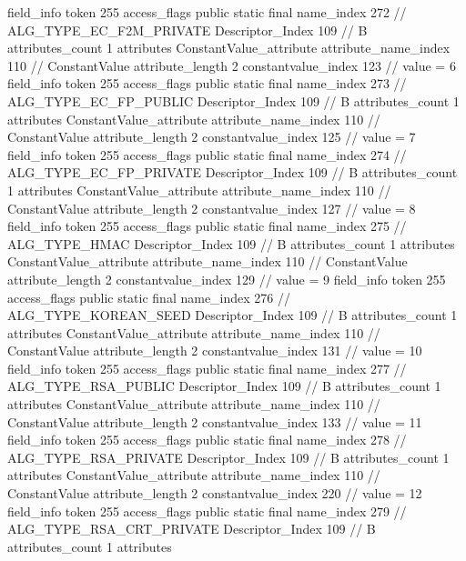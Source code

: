 {{{{{{{				}
				}
			}
			field_info {
				token	255
				access_flags	public static final
				name_index	272		// ALG_TYPE_EC_F2M_PRIVATE
				Descriptor_Index	109		// B
				attributes_count	1
				attributes {
				ConstantValue_attribute {
					attribute_name_index	110		// ConstantValue
					attribute_length	2
					constantvalue_index	123		// value = 6
				}
				}
			}
			field_info {
				token	255
				access_flags	public static final
				name_index	273		// ALG_TYPE_EC_FP_PUBLIC
				Descriptor_Index	109		// B
				attributes_count	1
				attributes {
				ConstantValue_attribute {
					attribute_name_index	110		// ConstantValue
					attribute_length	2
					constantvalue_index	125		// value = 7
				}
				}
			}
			field_info {
				token	255
				access_flags	public static final
				name_index	274		// ALG_TYPE_EC_FP_PRIVATE
				Descriptor_Index	109		// B
				attributes_count	1
				attributes {
				ConstantValue_attribute {
					attribute_name_index	110		// ConstantValue
					attribute_length	2
					constantvalue_index	127		// value = 8
				}
				}
			}
			field_info {
				token	255
				access_flags	public static final
				name_index	275		// ALG_TYPE_HMAC
				Descriptor_Index	109		// B
				attributes_count	1
				attributes {
				ConstantValue_attribute {
					attribute_name_index	110		// ConstantValue
					attribute_length	2
					constantvalue_index	129		// value = 9
				}
				}
			}
			field_info {
				token	255
				access_flags	public static final
				name_index	276		// ALG_TYPE_KOREAN_SEED
				Descriptor_Index	109		// B
				attributes_count	1
				attributes {
				ConstantValue_attribute {
					attribute_name_index	110		// ConstantValue
					attribute_length	2
					constantvalue_index	131		// value = 10
				}
				}
			}
			field_info {
				token	255
				access_flags	public static final
				name_index	277		// ALG_TYPE_RSA_PUBLIC
				Descriptor_Index	109		// B
				attributes_count	1
				attributes {
				ConstantValue_attribute {
					attribute_name_index	110		// ConstantValue
					attribute_length	2
					constantvalue_index	133		// value = 11
				}
				}
			}
			field_info {
				token	255
				access_flags	public static final
				name_index	278		// ALG_TYPE_RSA_PRIVATE
				Descriptor_Index	109		// B
				attributes_count	1
				attributes {
				ConstantValue_attribute {
					attribute_name_index	110		// ConstantValue
					attribute_length	2
					constantvalue_index	220		// value = 12
				}
				}
			}
			field_info {
				token	255
				access_flags	public static final
				name_index	279		// ALG_TYPE_RSA_CRT_PRIVATE
				Descriptor_Index	109		// B
				attributes_count	1
				attributes {
}}}}}}
